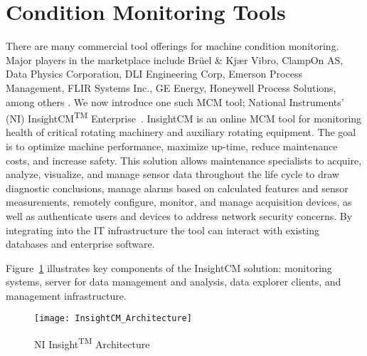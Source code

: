\section{Condition Monitoring Tools}

There are many commercial tool offerings for machine condition monitoring.
Major players in the marketplace include Br\"{u}el \& Kj{\ae}r Vibro, ClampOn AS, Data Physics Corporation, DLI Engineering Corp, Emerson Process Management, FLIR Systems Inc., GE Energy, Honeywell Process Solutions, among others \cite{ResarchandMarkets15}. 
We now introduce one such MCM tool; 
National Instruments' (NI) InsightCM\textsuperscript{TM} Enterprise~\cite{InsightCMBrochure15}. 
InsightCM is an online MCM tool for monitoring 
health of critical rotating machinery and auxiliary rotating equipment. The goal is to optimize machine performance, maximize up-time, reduce maintenance costs, and increase safety.
This solution allows maintenance specialists to
acquire, analyze, visualize, and manage sensor data throughout the life cycle to draw diagnostic conclusions, manage alarms based on calculated features and sensor measurements,
remotely configure, monitor, and manage acquisition devices, as well as
authenticate users and devices to address network security concerns. By integrating into the IT infrastructure the tool can interact with existing databases and enterprise software. 

Figure~\ref{fig:insightcm-architecture} illustrates key components of the InsightCM solution: monitoring systems, server for data management and analysis, data explorer clients, and management infrastructure.

\begin{figure}[ht]
    \centering
    \texttt{[image: InsightCM\_Architecture]}
    \caption{NI Insight\textsuperscript{TM} Architecture}
    \label{fig:insightcm-architecture}
\end{figure}


